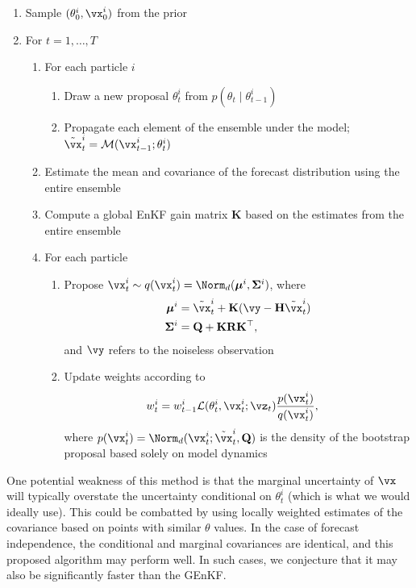 \documentclass[12pt]{article}
\begin{document}
\begin{enumerate}
    \item Sample $(\theta^i_0, \vx^i_0)$ from the prior
    \item For $t=1,\ldots,T$
    \begin{enumerate}
        \item For each particle $i$
        \begin{enumerate}
            \item Draw a new proposal $\theta^i_t$ from $p(\theta_t \mid \theta^i_{t-1})$
            \item Propagate each element of the ensemble under
            the model; $\tilde \vx^i_t = \mathcal M(\vx^i_{t-1}; \theta^i_t)$
        \end{enumerate}
        \item Estimate the mean and covariance of the forecast distribution using
        the entire ensemble
        \item Compute a global EnKF gain matrix $\mathbf K$ based on the estimates from
        the entire ensemble
        \item For each particle
        \begin{enumerate}
            \item Propose $\vx^i_t \sim q(\vx^i_t) = \Norm_d(\boldsymbol\mu^i, \mathbf\Sigma^i)$, where
            \begin{align}
                \boldsymbol\mu^i &= \tilde\vx^i_t + \mathbf K(\vy - \mathbf H\tilde\vx^i_t) \\
                \mathbf\Sigma^i &= \mathbf Q + \mathbf K\mathbf R\mathbf K^\top,
            \end{align}
            and $\vy$ refers to the noiseless observation
            \item Update weights according to 
            \begin{align}
                w^i_t &= w^i_{t-1}\mathcal L(\theta^i_t, \vx^i_t; \vz_t)\frac{p(\vx^i_t)}{q(\vx^i_t)},
            \end{align}
            where $p(\vx^i_t) = \Norm_d(\vx^i_t; \tilde \vx^i_t, \mathbf Q)$ is the density
            of the bootstrap proposal based solely on model dynamics
        \end{enumerate}
    \end{enumerate}
\end{enumerate}
One potential weakness of this method is that the marginal uncertainty of $\vx$
will typically overstate the uncertainty conditional on $\theta_t^i$
(which is what we would ideally use). This could be combatted by using locally
weighted estimates of the covariance based on points with similar $\theta$
values. In the case of forecast independence, the conditional and marginal
covariances are identical, and this proposed algorithm may perform well. In such
cases, we conjecture that it may also be significantly faster than the GEnKF.
\end{document}
